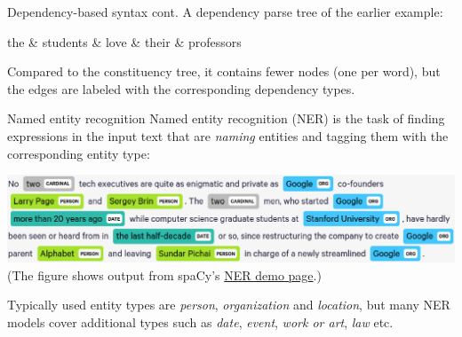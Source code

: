 \documentclass[style=upen, size=14pt]{powerdot}
\begin{document}
\begin{slide}[toc=]{Dependency-based syntax cont.}
  A dependency parse tree of the earlier example:
  \begin{center}
    \begin{dependency}[theme=simple, edge style={white}, label style={text=white}]
      \begin{deptext}[column sep=1em, nodes={text=white}]
        the \& students \& love \& their \& professors \\
      \end{deptext}
    \end{dependency}
  \end{center}
  Compared to the constituency tree, it contains fewer nodes (one per word), but
  the edges are labeled with the corresponding dependency types.
\end{slide}

\begin{slide}[toc=NER]{Named entity recognition}
  Named entity recognition (NER) is the task of finding expressions in the input
  text that are \emph{naming} entities and tagging them with the corresponding
  entity type: \bigskip

  \includegraphics[width=1\textwidth]{figures/ner.eps} {\footnotesize(The figure shows
    output from spaCy's \href{https://explosion.ai/demos/displacy-ent}{NER demo
      page}.)}\bigskip

  Typically used entity types are \emph{person}, \emph{organization} and
  \emph{location}, but many NER models cover additional types such
  as \emph{date}, \emph{event}, \emph{work or art}, \emph{law} etc.
\end{slide}
\end{document}
